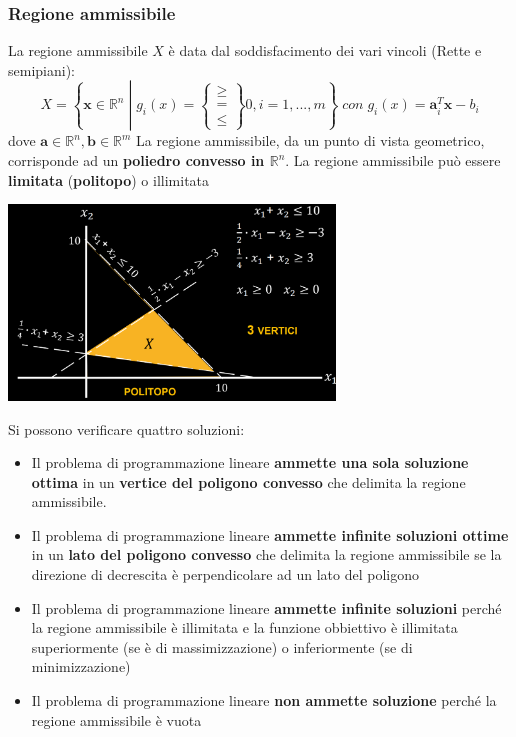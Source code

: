 \documentclass[12pt]{article}
\begin{document}
\subsubsection{Regione ammissibile}
La regione ammissibile $X$ è data dal soddisfacimento dei vari vincoli (Rette e semipiani):
$$X = \left \{\textbf{x} \in \mathbb{R}^n \middle | g_i(x) = \begin{Bmatrix}
    \geq \\
    = \\
    \leq
\end{Bmatrix}0, i=1,...,m \right \} \; con \; g_i(x) = \textbf{a}_i^T \textbf{x} - b_i$$ 
dove $\textbf{a} \in \mathbb{R}^n, \textbf{b} \in \mathbb{R}^m$ \newline
La regione ammissibile, da un punto di vista geometrico, corrisponde ad un \textbf{poliedro convesso in $\mathbb{R}^n$}.
La regione ammissibile può essere \textbf{limitata} (\textbf{politopo}) o illimitata
\begin{center}
    \includegraphics[width = 0.65\textwidth]{Images/12.PNG}
\end{center}
Si possono verificare quattro soluzioni:
\begin{itemize}
    \item Il problema di programmazione lineare \textbf{ammette una sola soluzione ottima} in un \textbf{vertice del poligono convesso}
    che delimita la regione ammissibile.
    \item Il problema di programmazione lineare \textbf{ammette infinite soluzioni ottime} in un \textbf{lato del poligono convesso} che delimita la regione ammissibile
    se la direzione di decrescita è perpendicolare ad un lato del poligono
    \item Il problema di programmazione lineare \textbf{ammette infinite soluzioni} perché la regione ammissibile è illimitata e la funzione obbiettivo è illimitata superiormente (se è di massimizzazione)
    o inferiormente (se di minimizzazione)
    \item Il problema di programmazione lineare \textbf{non ammette soluzione} perché la regione ammissibile è vuota
\end{itemize}
\end{document}
